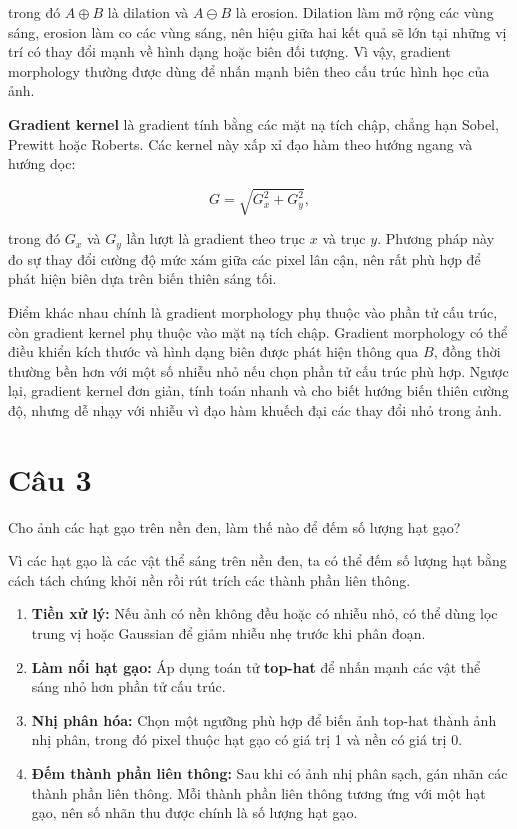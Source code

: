 trong đó $A \oplus B$ là dilation và $A \ominus B$ là erosion. Dilation làm mở rộng các vùng sáng, erosion làm co các vùng sáng, nên hiệu giữa hai kết quả sẽ lớn tại những vị trí có thay đổi mạnh về hình dạng hoặc biên đối tượng. Vì vậy, gradient morphology thường được dùng để nhấn mạnh biên theo cấu trúc hình học của ảnh.

\textbf{Gradient kernel} là gradient tính bằng các mặt nạ tích chập, chẳng hạn Sobel, Prewitt hoặc Roberts. Các kernel này xấp xỉ đạo hàm theo hướng ngang và hướng dọc:

\begin{equation}
    G = \sqrt{G_x^2 + G_y^2},
\end{equation}

trong đó $G_x$ và $G_y$ lần lượt là gradient theo trục $x$ và trục $y$. Phương pháp này đo sự thay đổi cường độ mức xám giữa các pixel lân cận, nên rất phù hợp để phát hiện biên dựa trên biến thiên sáng tối.

Điểm khác nhau chính là gradient morphology phụ thuộc vào phần tử cấu trúc, còn gradient kernel phụ thuộc vào mặt nạ tích chập. Gradient morphology có thể điều khiển kích thước và hình dạng biên được phát hiện thông qua $B$, đồng thời thường bền hơn với một số nhiễu nhỏ nếu chọn phần tử cấu trúc phù hợp. Ngược lại, gradient kernel đơn giản, tính toán nhanh và cho biết hướng biến thiên cường độ, nhưng dễ nhạy với nhiễu vì đạo hàm khuếch đại các thay đổi nhỏ trong ảnh.

\section*{Câu 3}
Cho ảnh các hạt gạo trên nền đen, làm thế nào để đếm số lượng hạt gạo?

Vì các hạt gạo là các vật thể sáng trên nền đen, ta có thể đếm số lượng hạt bằng cách tách chúng khỏi nền rồi rút trích các thành phần liên thông.

\begin{enumerate}
    \item \textbf{Tiền xử lý:} Nếu ảnh có nền không đều hoặc có nhiễu nhỏ, có thể dùng lọc trung vị hoặc Gaussian để giảm nhiễu nhẹ trước khi phân đoạn.

    \item \textbf{Làm nổi hạt gạo:} Áp dụng toán tử \textbf{top-hat} để nhấn mạnh các vật thể sáng nhỏ hơn phần tử cấu trúc.

    \item \textbf{Nhị phân hóa:} Chọn một ngưỡng phù hợp để biến ảnh top-hat thành ảnh nhị phân, trong đó pixel thuộc hạt gạo có giá trị 1 và nền có giá trị 0.

    \item \textbf{Đếm thành phần liên thông:} Sau khi có ảnh nhị phân sạch, gán nhãn các thành phần liên thông. Mỗi thành phần liên thông tương ứng với một hạt gạo, nên số nhãn thu được chính là số lượng hạt gạo.
\end{enumerate}


